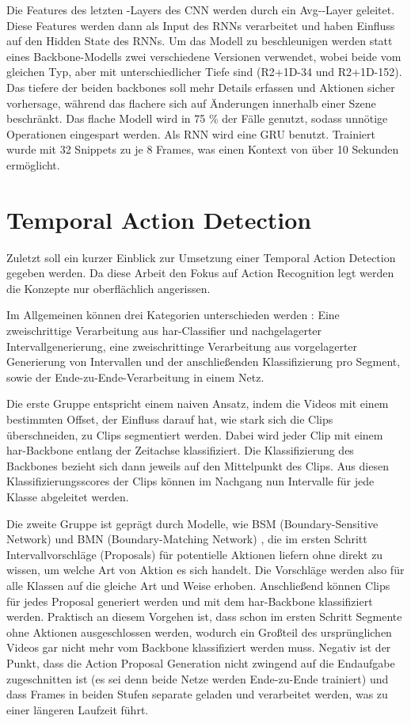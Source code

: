 Die Features des letzten \conv-Layers des CNN werden durch ein Avg-\pool-Layer geleitet.
Diese Features werden dann als Input des RNNs verarbeitet und haben Einfluss auf den Hidden State des RNNs.
Um das Modell zu beschleunigen werden statt eines Backbone-Modells zwei verschiedene Versionen verwendet, wobei beide vom gleichen Typ, aber mit unterschiedlicher Tiefe sind (\zB R2+1D-34 und R2+1D-152).
Das tiefere der beiden backbones soll mehr Details erfassen und Aktionen sicher vorhersage, während das flachere sich auf Änderungen innerhalb einer Szene beschränkt.
Das flache Modell wird in 75 \% der Fälle genutzt, sodass unnötige Operationen eingespart werden.
Als RNN wird eine GRU benutzt.
Trainiert wurde mit 32 Snippets zu je 8 Frames, was einen Kontext von über 10 Sekunden ermöglicht.

\section{Temporal Action Detection}
\label{sec:temporal-action-detection}

Zuletzt soll ein kurzer Einblick zur Umsetzung einer Temporal Action Detection gegeben werden.
Da diese Arbeit den Fokus auf Action Recognition legt werden die Konzepte nur oberflächlich angerissen.

Im Allgemeinen können drei Kategorien unterschieden werden \cite{Buch17}:
Eine zweischrittige Verarbeitung aus \gls{har}-Classifier und nachgelagerter Intervallgenerierung, eine zweischrittinge Verarbeitung aus vorgelagerter Generierung von Intervallen und der anschließenden Klassifizierung pro Segment, sowie der Ende-zu-Ende-Verarbeitung in einem Netz.

Die erste Gruppe entspricht einem naiven Ansatz, indem die Videos mit einem bestimmten Offset, der Einfluss darauf hat, wie stark sich die Clips überschneiden, zu Clips segmentiert werden.
Dabei wird jeder Clip mit einem \gls{har}-Backbone entlang der Zeitachse klassifiziert.
Die Klassifizierung des Backbones bezieht sich dann jeweils auf den Mittelpunkt des Clips.
Aus diesen Klassifizierungsscores der Clips können im Nachgang nun Intervalle für jede Klasse abgeleitet werden.

Die zweite Gruppe ist geprägt durch Modelle, wie BSM (Boundary-Sensitive Network) \cite{Lin18} und BMN (Boundary-Matching Network) \cite{Lin19}, die im ersten Schritt Intervallvorschläge (Proposals) für potentielle Aktionen liefern ohne direkt zu wissen, um welche Art von Aktion es sich handelt.
Die Vorschläge werden also für alle Klassen auf die gleiche Art und Weise erhoben.
Anschließend können Clips für jedes Proposal generiert werden und mit dem \gls{har}-Backbone klassifiziert werden.
Praktisch an diesem Vorgehen ist, dass schon im ersten Schritt Segmente ohne Aktionen ausgeschlossen werden, wodurch ein Großteil des ursprünglichen Videos gar nicht mehr vom Backbone klassifiziert werden muss.
Negativ ist der Punkt, dass die Action Proposal Generation nicht zwingend auf die Endaufgabe zugeschnitten ist (es sei denn beide Netze werden Ende-zu-Ende trainiert) und dass Frames in beiden Stufen separate geladen und verarbeitet werden, was zu einer längeren Laufzeit führt.


